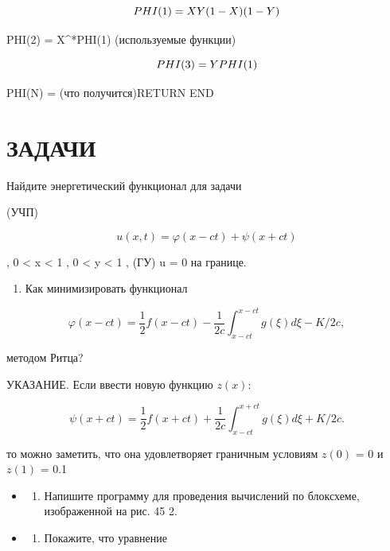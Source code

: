 \documentclass[
  ukrainian,
]{article}
\providecommand{\tightlist}{%
  \setlength{\itemsep}{0pt}\setlength{\parskip}{0pt}}
\begin{document}
\[
PHI(1) = X\*Y\*(1-X)\*(1-Y)
\]

PHI(2) = X\^{}*PHI(1) (используемые функции)

\[
PHI(3) = Y\*PHI(1)
\]

PHI(N) = (что получится)RETURN END

\section{\texorpdfstring{\textbf{ЗА}ДАЧИ}{ЗАДАЧИ}}\label{ux437ux430ux434ux430ux447ux438-5}

Найдите энергетический функционал для задачи

(УЧП)

\[
u(x, t) = \varphi(x - ct) + \psi(x + ct)
\]

, 0 \textless{} x \textless{} 1 , 0 \textless{} y \textless{} 1 , (ГУ) u
= 0 на границе.

\begin{enumerate}
\def\labelenumi{\arabic{enumi}.}
\setcounter{enumi}{1}
\tightlist
\item
  Как минимизировать функционал
\end{enumerate}

\[
\varphi(x-ct) = \frac{1}{2} f(x-ct) - \frac{1}{2c} \int_{x-ct}^{x-ct} g(\xi) d\xi - K/2c,
\]

методом Ритца?

УКАЗАНИЕ. Если ввести новую функцию \(z(x)\):

\[
\psi(x+ct) = \frac{1}{2} f(x+ct) + \frac{1}{2c} \int_{x-ct}^{x+ct} g(\xi) d\xi + K/2c.
\]

то можно заметить, что она удовлетворяет граничным условиям \(z(0)\) = 0
и \(z(1)\) = 0.1

\begin{itemize}
\tightlist
\item
  \begin{enumerate}
  \def\labelenumi{\arabic{enumi}.}
  \setcounter{enumi}{2}
  \tightlist
  \item
    Напишите программу для проведения вычислений по блоксхеме,
    изображенной на рис. 45 2.
  \end{enumerate}
\item
  \begin{enumerate}
  \def\labelenumi{\arabic{enumi}.}
  \setcounter{enumi}{3}
  \tightlist
  \item
    Покажите, что уравнение
  \end{enumerate}
\end{itemize}
\end{document}
